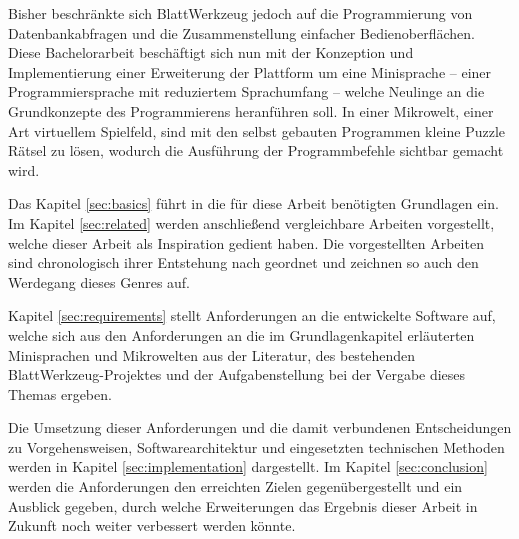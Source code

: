 Bisher beschränkte sich BlattWerkzeug jedoch auf die Programmierung von Datenbankabfragen und die Zusammenstellung einfacher Bedienoberflächen. Diese Bachelorarbeit beschäftigt sich nun mit der Konzeption und Implementierung einer Erweiterung der Plattform um eine Minisprache -- einer Programmiersprache mit reduziertem Sprachumfang -- welche Neulinge an die Grundkonzepte des Programmierens heranführen soll. In einer Mikrowelt, einer Art virtuellem Spielfeld, sind mit den selbst gebauten Programmen kleine Puzzle Rätsel zu lösen, wodurch die Ausführung der Programmbefehle sichtbar gemacht wird.

Das Kapitel \ref{sec:basics} führt in die für diese Arbeit benötigten Grundlagen ein. Im Kapitel \ref{sec:related} werden anschließend vergleichbare Arbeiten vorgestellt, welche dieser Arbeit als Inspiration gedient haben. Die vorgestellten Arbeiten sind chronologisch ihrer Entstehung nach geordnet und zeichnen so auch den Werdegang dieses Genres auf.

Kapitel \ref{sec:requirements} stellt Anforderungen an die entwickelte Software auf, welche sich aus den Anforderungen an die im Grundlagenkapitel erläuterten Minisprachen und Mikrowelten aus der Literatur, des bestehenden Blatt\-Werk\-zeug-Pro\-jektes und der Aufgabenstellung bei der Vergabe dieses Themas ergeben.

Die Umsetzung dieser Anforderungen und die damit verbundenen Entscheidungen zu Vorgehensweisen, Softwarearchitektur und eingesetzten technischen Methoden werden in Kapitel \ref{sec:implementation} dargestellt. Im Kapitel \ref{sec:conclusion} werden die Anforderungen den erreichten Zielen gegenübergestellt und ein Ausblick gegeben, durch welche Erweiterungen das Ergebnis dieser Arbeit in Zukunft noch weiter verbessert werden könnte.
